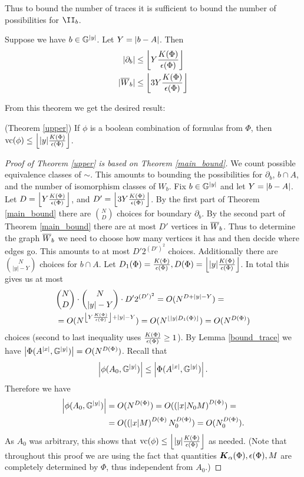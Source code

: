 \documentclass{amsart}
\begin{document}
Thus to bound the number of traces it is sufficient to bound the number of possibilities for $\II_b$.

\begin{Theorem} \label{main_bound}
  Suppose we have $b \in \mathbb G^{|y|}$.
  Let $Y = \left|b - A\right|$.
  Then
  \begin{align*}
    |\partial_b| &\leq \left \lfloor Y \frac{K(\Phi)}{\epsilon(\Phi)}  \right \rfloor\\ 
    |{\overline{W}}_b| &\leq \left \lfloor 3 Y \frac{K(\Phi)}{\epsilon(\Phi)} \right \rfloor
  \end{align*}
\end{Theorem}

From this theorem we get the desired result:
\begin{Corollary} (Theorem \ref{upper})
  If $\phi$ is a boolean combination of formulas from $\Phi$, then $\operatorname{vc}(\phi) \leq \left \lfloor |y|\frac{K(\Phi)}{\epsilon(\Phi)} \right \rfloor$.
\end{Corollary}

\begin{proof} [Proof of Theorem \ref{upper} is based on Theorem \ref{main_bound}]
  We count possible equivalence classes of $\sim$.
  This amounts to bounding the possibilities for $\partial_b$, $b \cap A$, and the number of isomorphism classes of $W_b$.
  Fix $b \in \mathbb G^{|y|}$ and let $Y = \left|b - A\right|$.
  Let $D = \left \lfloor Y \frac{K(\Phi)}{\epsilon(\Phi)} \right \rfloor$, and $D' = \left \lfloor 3Y \frac{K(\Phi)}{\epsilon(\Phi)} \right \rfloor$.
  By the first part of Theorem \ref{main_bound} there are $N \choose D$ choices for boundary $\partial_b$.
  By the second part of Theorem \ref{main_bound} there are at most $D'$ vertices in ${\overline{W}}_b$.
  Thus to determine the graph ${\overline{W}}_b$ we need to choose how many vertices it has and then decide where edges go.
  This amounts to at most $D' 2^{(D')^2}$ choices.
  Additionally there are $N \choose |y| - Y$ choices for $b \cap A$.
  Let $D_1(\Phi) = \frac{K(\Phi)}{\epsilon(\Phi)}, D(\Phi) = \left \lfloor |y|\frac{K(\Phi)}{\epsilon(\Phi)} \right \rfloor$.
  In total this gives us at most
  \begin{align*}
    &{N \choose D} \cdot {N \choose |y| - Y} \cdot D' 2^{(D')^2} = O(N^{D + |y| - Y}) = \\
    &= O(N^{\left \lfloor Y \frac{K(\Phi)}{\epsilon(\Phi)} \right \rfloor + |y| - Y}) = O(N^{\left \lfloor |y| D_1(\Phi) \right \rfloor}) = O(N^{D(\Phi)})
  \end{align*}
  choices (second to last inequality uses $\frac{K(\Phi)}{\epsilon(\Phi)} \geq 1$).
  By Lemma \ref{bound_trace} we have $\left|\Phi(A^{|x|}, \mathbb G^{|y|})\right| = O(N^{D(\Phi)})$.
  Recall that 
  \begin{align*}
    \left|\phi(A_0, \mathbb G^{|y|})\right| \leq \left|\Phi(A^{|x|}, \mathbb G^{|y|})\right|.    
  \end{align*}
  Therefore we have
  \begin{align*}
    \left|\phi(A_0, \mathbb G^{|y|})\right| &= O(N^{D(\Phi)}) = O(\left(|x| N_0 M\right)^{D(\Phi)}) = \\
    &= O(\left(|x| M\right)^{D(\Phi)} N_0^{D(\Phi)}) = O(N_0^{D(\Phi)}).
  \end{align*}
  As $A_0$ was arbitrary, this shows that $\operatorname{vc}(\phi) \leq \left \lfloor |y|\frac{K(\Phi)}{\epsilon(\Phi)} \right \rfloor$ as needed.
  (Note that throughout this proof we are using the fact that quantities $\boldsymbol K_\alpha(\Phi), \epsilon(\Phi), M$ are completely determined by $\Phi$,
  thus independent from $A_0$.)
\end{proof}
\end{document}
